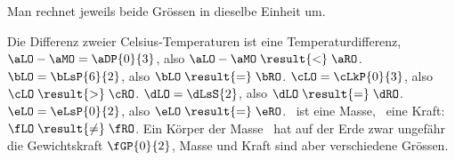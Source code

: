 Man rechnet jeweils beide Grössen in dieselbe Einheit um.
\begin{abcliste}
\abc Die Differenz zweier Celsius-Temperaturen ist eine Temperaturdifferenz, $\aLO - \aMO = \aDP{0}{3}$, also $\aLO - \aMO \;\result{<}\; \aRO$.
\abc $\bLO = \bLsP{6}{2}$, also $\bLO \;\result{=}\; \bRO$.
\abc $\cLO = \cLkP{0}{3}$, also $\cLO \;\result{>}\; \cRO$.
\abc $\dLO = \dLsS{2}$, also $\dLO \;\result{=}\; \dRO$.
\abc $\eLO = \eLsP{0}{2}$, also $\eLO \;\result{=}\; \eRO$.
\abc \fLO\ ist eine Masse, \fRO\ eine Kraft: $\fLO \;\result{\neq}\; \fRO$. Ein Körper der Masse \fLO\ hat auf der Erde zwar ungefähr die Gewichtskraft $\fGP{0}{2}$, Masse und Kraft sind aber verschiedene Grössen.
\end{abcliste}
